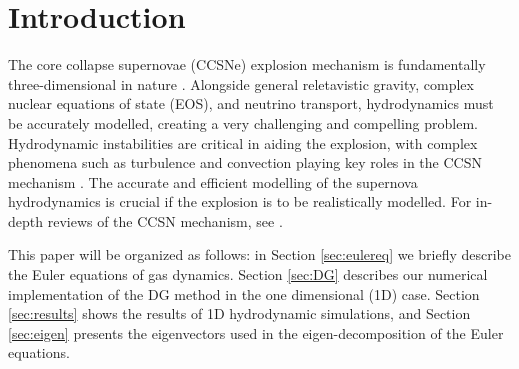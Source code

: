 \documentclass[onecolumn]{aastex62}
\begin{document}
\section{Introduction}
\label{sec:Intro}
The core collapse supernovae (CCSNe) explosion mechanism is fundamentally three-dimensional
in nature \citep[see e.g.,][]{blondin:2006, muller:2012, oconnor:2018b}. Alongside general
reletavistic gravity, complex nuclear equations of state (EOS), and
neutrino transport, hydrodynamics must be accurately modelled,
creating a very challenging and compelling problem. Hydrodynamic instabilities are critical
in aiding the explosion, with complex phenomena such as turbulence and
convection playing key roles in the CCSN mechanism
\citep{murphy:2011, murphy:2013, couch:2013, couch:2015a, radice:2016, mabanta:2018}.
The accurate and efficient modelling of the supernova hydrodynamics is crucial if the
explosion is to be realistically modelled.
For in-depth reviews of the CCSN mechanism, see \citet{bethe:1990, janka:2007, janka:2012a, janka:2016, burrows:2013, hix:2014, muller:2016, couch:2017}.


This paper will be organized as follows: in Section \ref{sec:eulereq} we briefly
describe the Euler equations of gas dynamics. Section \ref{sec:DG} describes our
numerical implementation of the DG method in the one dimensional (1D) case.
Section \ref{sec:results} shows the results of 1D hydrodynamic simulations,
and Section \ref{sec:eigen} presents the eigenvectors used in the eigen-decomposition
of the Euler equations.
\end{document}
